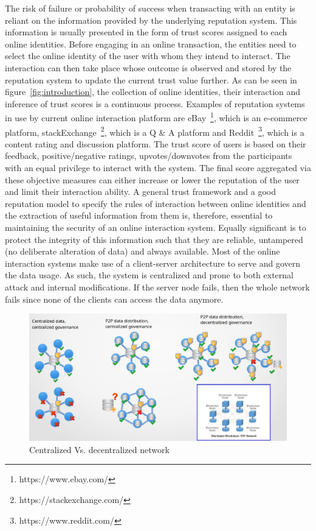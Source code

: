 The risk of failure or probability of success when transacting with an entity
is reliant on the information provided by the underlying reputation system.
This information is usually presented in the form of trust scores assigned to
each online identities. Before engaging in an online transaction, the entities
need to select the online identity of the user with whom they intend to
interact. The interaction can then take place whose outcome is observed and
stored by the reputation system to update the current trust value further. As
can be seen in figure~\ref{fig:introduction}, the collection of online
identities, their interaction and inference of trust scores is a continuous
process. Examples of reputation systems in use by current online interaction
platform are eBay~\footnote{https://www.ebay.com/}, which is an e-commerce
platform, stackExchange~\footnote{https://stackexchange.com/}, which is a Q \&
A platform and Reddit~\footnote{https://www.reddit.com/}, which is a content
rating and discussion platform. The trust score of users is based on their
feedback, positive/negative ratings, upvotes/downvotes from the participants
with an equal privilege to interact with the system. The final score aggregated
via these objective measures can either increase or lower the reputation of the
user and limit their interaction ability. A general trust framework and a good
reputation model to specify the rules of interaction between online identities
and the extraction of useful information from them is, therefore, essential to
maintaining the security of an online interaction system. Equally significant
is to protect the integrity of this information such that they are reliable,
untampered (no deliberate alteration of data) and always available. Most of the
online interaction systems make use of a client-server architecture to serve
and govern the data usage. As such, the system is centralized and prone to both
external attack and internal modifications. If the server node fails, then the
whole network fails since none of the clients can access the data anymore. 
\begin{figure}
	\begin{center}
		\includegraphics[width=1.0\textwidth]{Images/WhyBlockchain.eps}
		\caption{Centralized Vs. decentralized network}
		\label{fig:WhyBlockchain}
	\end{center}
\end{figure}
